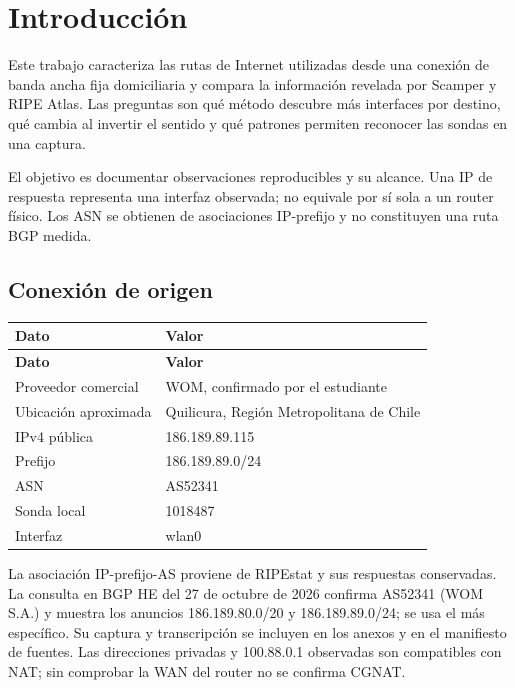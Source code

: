\section{Introducción}\label{sec:intro}
Este trabajo caracteriza las rutas de Internet utilizadas desde una conexión de banda ancha fija domiciliaria y compara la información revelada por Scamper y RIPE Atlas. Las preguntas son qué método descubre más interfaces por destino, qué cambia al invertir el sentido y qué patrones permiten reconocer las sondas en una captura.

El objetivo es documentar observaciones reproducibles y su alcance. Una IP de respuesta representa una interfaz observada; no equivale por sí sola a un router físico. Los ASN se obtienen de asociaciones IP-prefijo y no constituyen una ruta BGP medida.

\subsection{Conexión de origen}
\begingroup
\fontsize{9}{11}\selectfont
\addtocounter{table}{-1}
\begin{longtable}{p{4.2cm}p{10.3cm}}
\toprule
\textbf{Dato} & \textbf{Valor} \\ \midrule
\endfirsthead
\toprule
\textbf{Dato} & \textbf{Valor} \\ \midrule
\endhead
Proveedor comercial & WOM, confirmado por el estudiante \\
Ubicación aproximada & Quilicura, Región Metropolitana de Chile \\
IPv4 pública & 186.189.89.115 \\
Prefijo & 186.189.89.0/24 \\
ASN & AS52341 \\
Sonda local & 1018487 \\
Interfaz & wlan0 \\
\bottomrule
\end{longtable}
\endgroup
La asociación IP-prefijo-AS proviene de RIPEstat y sus respuestas conservadas. La consulta en BGP HE del 27 de octubre de 2026 confirma AS52341 (WOM S.A.) y muestra los anuncios 186.189.80.0/20 y 186.189.89.0/24; se usa el más específico. Su captura y transcripción se incluyen en los anexos y en el manifiesto de fuentes. Las direcciones privadas y 100.88.0.1 observadas son compatibles con NAT; sin comprobar la WAN del router no se confirma CGNAT.


